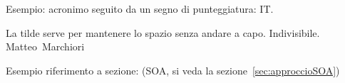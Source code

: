 Esempio: acronimo seguito da un segno di punteggiatura:
\ac{IT}\@.

La tilde serve per mantenere lo spazio senza andare a capo. Indivisibile.
Matteo~Marchiori

Esempio riferimento a sezione: (\textsc{SOA}, si veda la sezione~\vref{sec:approccioSOA})